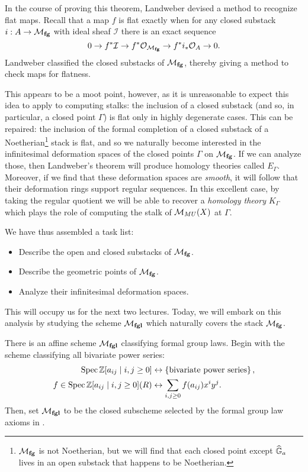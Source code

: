 \noindent In the course of proving this theorem, Landweber devised a method to recognize flat maps.  Recall that a map $f$ is flat exactly when for any closed substack $i: A \to \mathcal{M}_{\mathbf{fg}}$ with ideal sheaf $\mathcal I$ there is an exact sequence \[0 \to f^* \mathcal I \to f^* \mathcal O_{\mathcal{M}_{\mathbf{fg}}} \to f^* i_* \mathcal O_A \to 0.\]  Landweber classified the closed substacks of $\mathcal{M}_{\mathbf{fg}}$, thereby giving a method to check maps for flatness.

This appears to be a moot point, however, as it is unreasonable to expect this idea to apply to computing stalks: the inclusion of a closed substack (and so, in particular, a closed point $\Gamma$) is flat only in highly degenerate cases.  This can be repaired: the inclusion of the formal completion of a closed substack of a Noetherian\footnote{$\mathcal{M}_{\mathbf{fg}}$ is not Noetherian, but we will find that each closed point except $\widehat{\mathbb G}_a$ lives in an open substack that happens to be Noetherian.} stack is flat, and so we naturally become interested in the infinitesimal deformation spaces of the closed points $\Gamma$ on $\mathcal{M}_{\mathbf{fg}}$.  If we can analyze those, then Landweber's theorem will produce homology theories called $E_\Gamma$.  Moreover, if we find that these deformation spaces are \emph{smooth}, it will follow that their deformation rings support regular sequences.  In this excellent case, by taking the regular quotient we will be able to recover a \emph{homology theory} $K_\Gamma$ which plays the role of computing the stalk of $\mathcal{M}_{MU}(X)$ at $\Gamma$.

We have thus assembled a task list:
\begin{itemize}
\item Describe the open and closed substacks of $\mathcal{M}_{\mathbf{fg}}$.
\item Describe the geometric points of $\mathcal{M}_{\mathbf{fg}}$.
\item Analyze their infinitesimal deformation spaces.
\end{itemize}
This will occupy us for the next two lectures.  Today, we will embark on this analysis by studying the scheme $\mathcal{M}_{\mathbf{fgl}}$ which naturally covers the stack $\mathcal{M}_{\mathbf{fg}}$.


\begin{definition}
There is an affine scheme $\mathcal{M}_{\mathbf{fgl}}$ classifying formal group laws.  Begin with the scheme classifying all bivariate power series:
\begin{align*}
\operatorname{Spec} \mathbb Z[a_{ij} \mid i, j \ge 0] & \leftrightarrow \left\{ \text{bivariate power series} \right\}, \\
f \in \operatorname{Spec}\mathbb Z[a_{ij} \mid i, j \ge 0](R) & \leftrightarrow \sum_{i, j \ge 0} f(a_{ij}) x^i y^j.
\end{align*}
Then, set $\mathcal{M}_{\mathbf{fgl}}$ to be the closed subscheme selected by the formal group law axioms in .
\end{definition}

